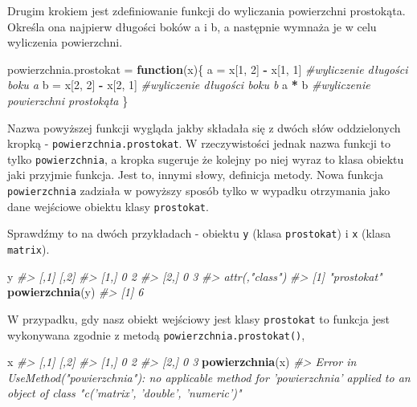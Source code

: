 \documentclass[paper=6in:9in,pagesize=pdftex,headinclude=on,footinclude=on,10pt]{scrbook}
\newenvironment{Shaded}{\begin{snugshade}}{\end{snugshade}}
\newcommand{\CommentTok}[1]{\textcolor[rgb]{0.56,0.35,0.01}{\textit{#1}}}
\newcommand{\ControlFlowTok}[1]{\textcolor[rgb]{0.13,0.29,0.53}{\textbf{#1}}}
\newcommand{\DecValTok}[1]{\textcolor[rgb]{0.00,0.00,0.81}{#1}}
\newcommand{\KeywordTok}[1]{\textcolor[rgb]{0.13,0.29,0.53}{\textbf{#1}}}
\newcommand{\NormalTok}[1]{#1}
\newcommand{\OperatorTok}[1]{\textcolor[rgb]{0.81,0.36,0.00}{\textbf{#1}}}
\newcommand{\StringTok}[1]{\textcolor[rgb]{0.31,0.60,0.02}{#1}}
\begin{document}
Drugim krokiem jest zdefiniowanie funkcji do wyliczania powierzchni prostokąta.
Określa ona najpierw długości boków a i b, a następnie wymnaża je w celu wyliczenia powierzchni.

\begin{Shaded}
\begin{Highlighting}[]
\NormalTok{powierzchnia.prostokat =}\StringTok{ }\ControlFlowTok{function}\NormalTok{(x)\{}
\NormalTok{  a =}\StringTok{ }\NormalTok{x[}\DecValTok{1}\NormalTok{, }\DecValTok{2}\NormalTok{] }\OperatorTok{-}\StringTok{ }\NormalTok{x[}\DecValTok{1}\NormalTok{, }\DecValTok{1}\NormalTok{] }\CommentTok{#wyliczenie długości boku a}
\NormalTok{  b =}\StringTok{ }\NormalTok{x[}\DecValTok{2}\NormalTok{, }\DecValTok{2}\NormalTok{] }\OperatorTok{-}\StringTok{ }\NormalTok{x[}\DecValTok{2}\NormalTok{, }\DecValTok{1}\NormalTok{] }\CommentTok{#wyliczenie długości boku b}
\NormalTok{  a }\OperatorTok{*}\StringTok{ }\NormalTok{b                 }\CommentTok{#wyliczenie powierzchni prostokąta}
\NormalTok{\}}
\end{Highlighting}
\end{Shaded}

Nazwa powyższej funkcji wygląda jakby składała się z dwóch słów oddzielonych kropką - \texttt{powierzchnia.prostokat}.
W rzeczywistości jednak nazwa funkcji to tylko \texttt{powierzchnia}, a kropka sugeruje że kolejny po niej wyraz to klasa obiektu jaki przyjmie funkcja.
Jest to, innymi słowy, definicja metody.
Nowa funkcja \texttt{powierzchnia} zadziała w powyższy sposób tylko w wypadku otrzymania jako dane wejściowe obiektu klasy \texttt{prostokat}.

Sprawdźmy to na dwóch przykładach - obiektu \texttt{y} (klasa \texttt{prostokat}) i \texttt{x} (klasa \texttt{matrix}).

\begin{Shaded}
\begin{Highlighting}[]
\NormalTok{y}
\CommentTok{#>      [,1] [,2]}
\CommentTok{#> [1,]    0    2}
\CommentTok{#> [2,]    0    3}
\CommentTok{#> attr(,"class")}
\CommentTok{#> [1] "prostokat"}
\KeywordTok{powierzchnia}\NormalTok{(y)}
\CommentTok{#> [1] 6}
\end{Highlighting}
\end{Shaded}

W przypadku, gdy nasz obiekt wejściowy jest klasy \texttt{prostokat} to funkcja jest wykonywana zgodnie z metodą \texttt{powierzchnia.prostokat()},

\begin{Shaded}
\begin{Highlighting}[]
\NormalTok{x}
\CommentTok{#>      [,1] [,2]}
\CommentTok{#> [1,]    0    2}
\CommentTok{#> [2,]    0    3}
\KeywordTok{powierzchnia}\NormalTok{(x)}
\CommentTok{#> Error in UseMethod("powierzchnia"): no applicable method for 'powierzchnia' applied to an object of class "c('matrix', 'double', 'numeric')"}
\end{Highlighting}
\end{Shaded}
\end{document}

